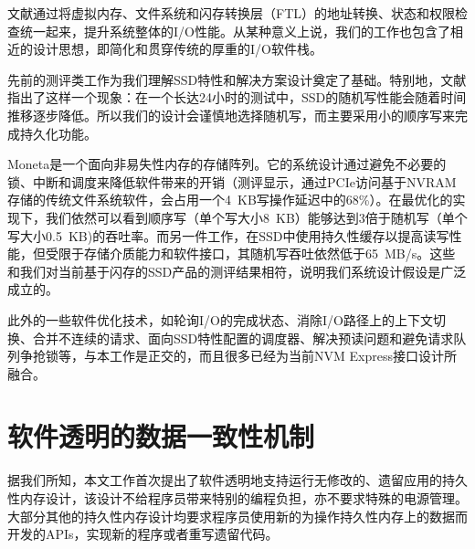 文献\cite{Huang:2015:UAT:2749469.2750420}通过将虚拟内存、文件系统和闪存转换层（FTL）的地址转换、状态和权限检查统一起来，提升系统整体的I/O性能。从某种意义上说，我们的工作也包含了相近的设计思想，即简化和贯穿传统的厚重的I/O软件栈。

先前的测评类工作\cite{Stoica:2009:ERW:1565694.1565697,Chen:2009:UIC:1555349.1555371,Jung:2013:RWH:2465529.2465548}为我们理解SSD特性和解决方案设计奠定了基础。特别地，文献
\cite{Stoica:2009:ERW:1565694.1565697}指出了这样一个现象：在一个长达24小时的测试中，SSD的随机写性能会随着时间推移逐步降低。所以我们的设计会谨慎地选择随机写，而主要采用小的顺序写来完成持久化功能。

Moneta\cite{Caulfield:2010:MHS:1934902.1934984}是一个面向非易失性内存的存储阵列。它的系统设计通过避免不必要的锁、中断和调度来降低软件带来的开销（测评显示，通过PCIe访问基于NVRAM存储的传统文件系统软件，会占用一个4~KB写操作延迟中的68\%）。在最优化的实现下，我们依然可以看到顺序写（单个写大小8~KB）能够达到3倍于随机写（单个写大小0.5~KB)的吞吐率。而另一件工作\cite{Kang:2014:DWC:2588555.2595632}，在SSD中使用持久性缓存以提高读写性能，但受限于存储介质能力和软件接口，其随机写吞吐依然低于65~MB/s。这些和我们对当前基于闪存的SSD产品的测评结果相符，说明我们系统设计假设是广泛成立的。

此外的一些软件优化技术\cite{Yu:2014:OBI:2642648.2619092}，如轮询I/O的完成状态、消除I/O路径上的上下文切换、合并不连续的请求、面向SSD特性配置的调度器、解决预读问题和避免请求队列争抢锁等，与本工作是正交的，而且很多已经为当前NVM Express接口设计所融合。

\section{软件透明的数据一致性机制}

据我们所知，本文工作首次提出了软件透明地支持运行无修改的、遗留应用的持久性内存设计，该设计不给程序员带来特别的编程负担，亦不要求特殊的电源管理。大部分其他的持久性内存设计\cite{Volos:2011:MLP:1950365.1950379,
Coburn:2011:NMP:1950365.1950380,
Venkataraman:2011:CDD:1960475.1960480, Intel:PMEM, SNIA:2013:NPM,
Zhao:2013:KCP:2540708.2540744, Moraru:2013:CDS, Kannan:2014:RCP,
Liu:2014:NDU:2541940.2541957, Pelley:2014:MP}均要求程序员使用新的为操作持久性内存上的数据而开发的APIs，实现新的程序或者重写遗留代码。

